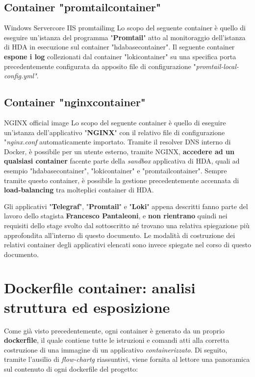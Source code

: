 \subsection{Container "promtailcontainer"}
\begin{namespacedesc}
	 {Windows Servercore IIS}
	 {promtailimg}
	 {Lo scopo del seguente container è quello di eseguire un'istanza del programma "\textbf{Promtail}" atto al monitoraggio dell'istanza di HDA in esecuzione sul container "hdabasecontainer". Il seguente container \textbf{espone i log} collezionati dal container "lokicontainer" su una specifica porta precedentemente configurata da apposito file di configurazione "\textit{promtail-local-config.yml"}}.
\end{namespacedesc}	

\subsection{Container "nginxcontainer"}
\begin{namespacedesc}
	 {NGINX official image}
	 {Lo scopo del seguente container è quello di eseguire un'istanza dell'applicativo "\textbf{NGINX}" con il relativo file di configurazione "\textit{nginx.conf} automaticamente importato. Tramite il resolver DNS interno di Docker, è possibile per un utente esterno, tramite NGINX, \textbf{accedere ad un qualsiasi container} facente parte della \textit{sandbox} applicativa di HDA, quali ad esempio "hdabasecontainer", "lokicontainer" e "promtailcontainer". Sempre tramite questo container, è possibile la gestione precedentemente accennata di \textbf{load-balancing} tra molteplici container di HDA.}
\end{namespacedesc}
Gli applicativi "\textbf{Telegraf}", "\textbf{Promtail}" e "\textbf{Loki}" appena descritti fanno parte del lavoro dello stagista \textbf{Francesco Pantaleoni}, e \textbf{non rientrano} quindi nei requisiti dello stage svolto dal sottoscritto né trovano una relativa spiegazione più approfondita all'interno di questo documento. Le modalità di costruzione dei relativi container degli applicativi elencati sono invece spiegate nel corso di questo documento.

\newpage	

\section{Dockerfile container: analisi struttura ed esposizione}
Come già visto precedentemente, ogni container è generato da un proprio \textbf{dockerfile}, il quale contiene tutte le istruzioni e comandi atti alla corretta costruzione di una immagine di un applicativo \textit{containerizzato}.
Di seguito, tramite l'ausilio di \textit{\gls{flow-chartg}} riassuntivi, viene fornita al lettore una panoramica sul contenuto di ogni dockerfile del progetto:
